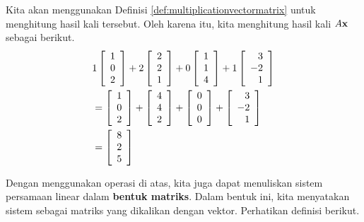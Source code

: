 \begin{solution} Kita akan menggunakan Definisi \ref{def:multiplicationvectormatrix} untuk menghitung hasil kali tersebut.
Oleh karena itu, kita menghitung hasil kali $A\mathbf{x}$ sebagai berikut. 
\begin{eqnarray*}
& 1\left[
\begin{array}{r}
1 \\
0 \\
2
\end{array}
\right] + 2\left[
\begin{array}{r}
2 \\
2 \\
1
\end{array}
\right] + 0\left[
\begin{array}{r}
1 \\
1 \\
4
\end{array}
\right] + 1 \left[
\begin{array}{r}
3 \\
-2\\
1
\end{array} 
\right] \\ 
&=
\left[
\begin{array}{r}
1 \\
0 \\
2
\end{array}
\right] + \left[
\begin{array}{r}
4 \\
4 \\
2
\end{array}
\right] + \left[
\begin{array}{r}
0 \\
0 \\
0
\end{array}
\right] +  \left[
\begin{array}{r}
3 \\
-2\\
1
\end{array} 
\right] \\
&=
\left[
\begin{array}{r}
8 \\
2 \\
5
\end{array}
\right]
\end{eqnarray*}
\end{solution}

Dengan menggunakan operasi di atas, kita juga dapat menuliskan sistem persamaan linear dalam \textbf{bentuk matriks}. Dalam bentuk ini,
kita menyatakan sistem sebagai matriks yang dikalikan dengan vektor. Perhatikan definisi berikut.

